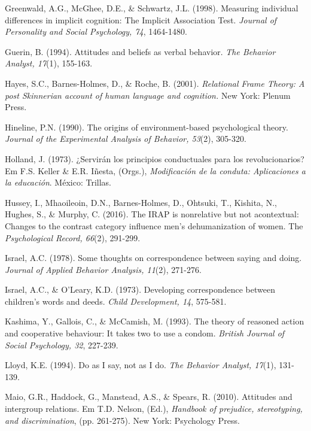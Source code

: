 \hangindent=25pt
\noindent Greenwald, A.G., McGhee, D.E., \& Schwartz, J.L. (1998). Measuring individual differences in implicit cognition: The Implicit Association Test. \textit{Journal of Personality and Social Psychology, 74}, 1464-1480.

\hangindent=25pt
\noindent Guerin, B. (1994). Attitudes and beliefs as verbal behavior. \textit{The Behavior Analyst, 17}(1), 155-163.

\hangindent=25pt
\noindent Hayes, S.C., Barnes-Holmes, D., \& Roche, B. (2001). \textit{Relational Frame Theory: A post Skinnerian account of human language and cognition.} New York: Plenum Press.

\hangindent=25pt
\noindent Hineline, P.N. (1990). The origins of environment-based psychological theory. \textit{Journal of the Experimental Analysis of Behavior, 53}(2), 305-320.

\hangindent=25pt
\noindent Holland, J. (1973). ¿Servirán los principios conductuales para los revolucionarios? Em F.S. Keller \& E.R. Iñesta, (Orgs.), \textit{Modificación de la conduta: Aplicaciones a la educación}. México: Trillas.

\hangindent=25pt
\noindent Hussey, I., Mhaoileoin, D.N., Barnes-Holmes, D., Ohtsuki, T., Kishita, N., Hughes, S., \& Murphy, C. (2016). The IRAP is nonrelative but not acontextual: Changes to the contrast category influence men’s dehumanization of women. The \textit{Psychological Record, 66}(2), 291-299. 

\hangindent=25pt
\noindent Israel, A.C. (1978). Some thoughts on correspondence between saying and doing. \textit{Journal of Applied Behavior Analysis, 11}(2), 271-276.

\hangindent=25pt
\noindent Israel, A.C., \& O'Leary, K.D. (1973). Developing correspondence be\-tween children's words and deeds. \textit{Child Development, 14}, 575-581.

\hangindent=25pt
\noindent Kashima, Y., Gallois, C., \& McCamish, M. (1993). The theory of reasoned action and cooperative behaviour: It takes two to use a condom. \textit{British Journal of Social Psychology, 32}, 227-239.

\hangindent=25pt
\noindent Lloyd, K.E. (1994). Do as I say, not as I do. \textit{The Behavior Analyst, 17}(1), 131-139.

\hangindent=25pt
\noindent Maio, G.R., Haddock, G., Manstead, A.S., \& Spears, R. (2010). Attitudes and intergroup relations. Em T.D. Nelson, (Ed.), \textit{Handbook of prejudice, stereotyping, and discrimination}, (pp. 261-275). New York: Psychology Press. 

